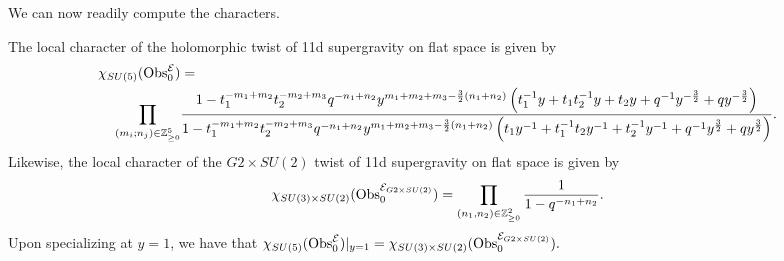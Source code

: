 We can now readily compute the characters.
\begin{prop}
The local character of the holomorphic twist of 11d supergravity on flat space is given by 
\begin{align*}
\chi_{SU(5)} ({\rm Obs}_0^\mathcal E) &=  \\
\prod_ {(m_i;n_j)\in \mathbb{Z}^5_{\geq 0}} & \frac{1- t_1^{-m_1+m_2}t_2^{-m_2+m_3}q^{-n_1+n_2}y^{m_1+m_2+m_3-\frac 3 2 (n_1+n_2)}\left (t_1^{-1}y + t_1t_2^{-1}y + t_2y + q^{-1}y^{-\frac 3 2} + qy^{-\frac 3 2} \right)}{1- t_1^{-m_1+m_2}t_2^{-m_2+m_3}q^{-n_1+n_2}y^{m_1+m_2+m_3-\frac 3 2 (n_1+n_2)}\left (t_1y^{-1} + t_1^{-1}t_2y^{-1} + t_2^{-1}y^{-1} + q^{-1}y^{\frac 3 2} + qy^{\frac 3 2} \right)}.
\end{align*}
Likewise, the  local character of the $G2\times SU(2)$ twist of 11d supergravity on flat space is given by
\[
\chi_{SU(3)\times SU(2)}({\rm Obs}_0^{\mathcal E_{G2\times SU(2)}}) = \prod _{(n_1,n_2)\in \mathbb{Z}^2_{\geq 0}} \frac{1}{1-q^{-n_1+n_2}}.
\] 
Upon specializing at $y=1$, we have that $\chi_{SU(5)} ({\rm Obs}_0^\mathcal E)|_{y=1} =  \chi_{SU(3)\times SU(2)}({\rm Obs}_0^{\mathcal E_{G2\times SU(2)}}).$
\end{prop}
